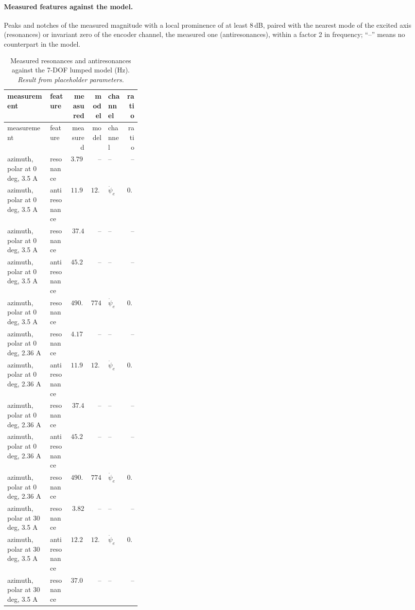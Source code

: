 \documentclass[10pt,a4paper]{article}
\numberwithin{equation}{section}
\begin{document}
\paragraph{Measured features against the model.} Peaks and notches of the measured magnitude with a local prominence of at least 8\,dB, paired with the nearest mode of the excited axis (resonances) or invariant zero of the encoder channel, the measured one (antiresonances), within a factor 2 in frequency; ``--'' means no counterpart in the model.
\begin{longtable}{p{0.32\linewidth}lrrlr}
\caption{Measured resonances and antiresonances against the 7-DOF lumped model (Hz). \emph{Result from placeholder parameters.}}\label{tab:exp_features}\\
\toprule measurement & feature & measured & model & channel & ratio \\ \midrule\endfirsthead
\toprule measurement & feature & measured & model & channel & ratio \\ \midrule\endhead
azimuth, polar at 0 deg, 3.5 A & resonance & $3.797$ & -- & -- & -- \\
azimuth, polar at 0 deg, 3.5 A & antiresonance & $11.92$ & $12.26$ & $\dot\psi_e$ & $0.972$ \\
azimuth, polar at 0 deg, 3.5 A & resonance & $37.4$ & -- & -- & -- \\
azimuth, polar at 0 deg, 3.5 A & antiresonance & $45.26$ & -- & -- & -- \\
azimuth, polar at 0 deg, 3.5 A & resonance & $490.4$ & $774$ & $\dot\psi_e$ & $0.634$ \\
azimuth, polar at 0 deg, 2.36 A & resonance & $4.177$ & -- & -- & -- \\
azimuth, polar at 0 deg, 2.36 A & antiresonance & $11.92$ & $12.26$ & $\dot\psi_e$ & $0.972$ \\
azimuth, polar at 0 deg, 2.36 A & resonance & $37.4$ & -- & -- & -- \\
azimuth, polar at 0 deg, 2.36 A & antiresonance & $45.26$ & -- & -- & -- \\
azimuth, polar at 0 deg, 2.36 A & resonance & $490.4$ & $774$ & $\dot\psi_e$ & $0.634$ \\
azimuth, polar at 30 deg, 3.5 A & resonance & $3.82$ & -- & -- & -- \\
azimuth, polar at 30 deg, 3.5 A & antiresonance & $12.25$ & $12.71$ & $\dot\psi_e$ & $0.964$ \\
azimuth, polar at 30 deg, 3.5 A & resonance & $37.06$ & -- & -- & -- \\

\end{longtable}
\end{document}
